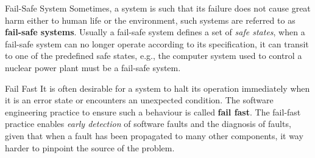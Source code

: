 \documentclass[11pt, a4paper]{article}
\begin{document}
\begin{definition}{Fail-Safe System}{}
    Sometimes, a system is such that its failure does not cause great harm either to human life or the environment, such systems are referred to as \textbf{fail-safe systems}.
    Usually a fail-safe system defines a set of \textit{safe states}, when a fail-safe system can no longer operate according to its specification, it can transit to one of the predefined safe states, e.g., the computer system used to control a nuclear power plant must be a fail-safe system.
\end{definition}
\begin{definition}{Fail Fast}{}
    It is often desirable for a system to halt its operation immediately when it is an error state or encounters an unexpected condition. The software engineering practice to ensure such a behaviour is called \textbf{fail fast}.
    The fail-fast practice enables \textit{early detection} of software faults and the diagnosis of faults, given that when a fault has been propagated to many other components, it way harder to pinpoint the source of the problem.
\end{definition}
\end{document}
